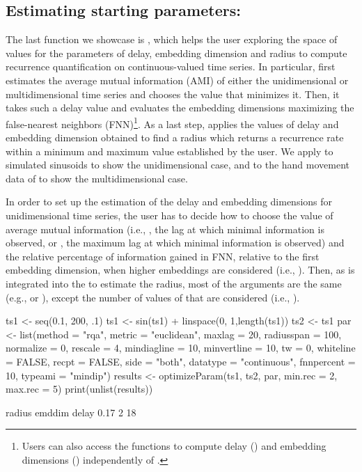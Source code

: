 \subsection[Estimating starting parameters: optimizeParam]{Estimating starting parameters: }

The last function we showcase is , which helps the user exploring the space of values for the parameters of delay, embedding dimension and radius to compute recurrence quantification on continuous-valued time series. In particular,  first estimates the average mutual information (AMI) of either the unidimensional or multidimensional time series and chooses the value that minimizes it. Then, it takes such a delay value and evaluates the embedding dimensions maximizing the false-nearest neighbors (FNN)\footnote{Users can also access the functions to compute delay () and embedding dimensions () independently of .}. As a last step,  applies the values of delay and embedding dimension obtained to find a radius which returns a recurrence rate within a minimum and maximum value established by the user. We apply  to simulated sinusoids to show the unidimensional case, and to the hand movement data of \cite{wallot2016beyond} to show the multidimensional case.

In order to set up the estimation of the delay and embedding dimensions for unidimensional time series, the user has to decide how to choose the value of average mutual information (i.e., , the lag at which minimal information is observed, or , the maximum lag at which minimal information is observed) and the relative percentage of information gained in FNN, relative to the first embedding dimension, when higher embeddings are considered (i.e., ). Then, as  is integrated into the  to estimate the radius, most of the arguments are the same (e.g.,  or ), except the number of values of that are considered (i.e., ).

\begin{example}
ts1 <- seq(0.1, 200, .1) 
ts1 <- sin(ts1) + linspace(0, 1,length(ts1)) 
ts2 <- ts1 
par <- list(method = "rqa", metric = "euclidean", maxlag =  20, radiusspan = 100,
            normalize = 0, rescale = 4,  mindiagline = 10, minvertline = 10, tw = 0,
            whiteline = FALSE, recpt = FALSE, side = "both", datatype = "continuous",
            fnnpercent  = 10,  typeami = "mindip")
results <- optimizeParam(ts1, ts2, par, min.rec = 2, max.rec = 5)
print(unlist(results))

radius emddim  delay
0.17   2       18 
\end{example}

